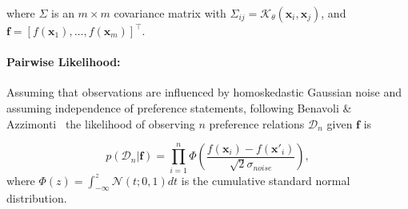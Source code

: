 \documentclass{article}
\begin{document}
where \(\Sigma\) is an \(m \times m\) covariance matrix with \(\Sigma_{ij} = \mathcal{K}_\theta(\mathbf{x}_i, \mathbf{x}_j)\), and  $\mathbf{f} = [f(\mathbf{x}_1), \ldots, f(\mathbf{x}_m)]^\top$.

\paragraph{Pairwise Likelihood:}
Assuming that observations are influenced by homoskedastic Gaussian noise and assuming independence of preference statements, following Benavoli \& Azzimonti~\cite{benavoli2024tutorial} the likelihood of observing $n$ preference relations $\mathcal{D}_n$ given $\mathbf{f}$ is 



\begin{equation}\label{eq:likelihood}
    p(\mathcal{D}_n|\mathbf{f}) = \prod_{i=1}^{n}\Phi(\frac{f(\mathbf{x}_i) - f(\mathbf{x}'_i)}{\sqrt{2}\sigma_{noise}}),
\end{equation}
 where $\Phi(z) = \int_{-\infty}^z \mathcal{N}(t;0, 1)dt$ is the cumulative standard normal distribution.
\end{document}
